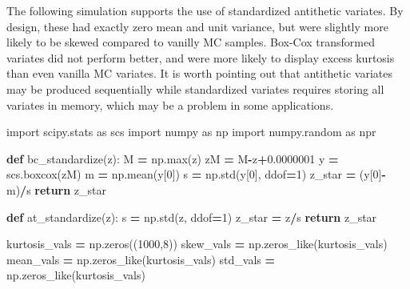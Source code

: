 \documentclass[
]{book}
\newenvironment{Shaded}{\begin{snugshade}}{\end{snugshade}}
\newcommand{\BuiltInTok}[1]{#1}
\newcommand{\ControlFlowTok}[1]{\textcolor[rgb]{0.13,0.29,0.53}{\textbf{#1}}}
\newcommand{\DecValTok}[1]{\textcolor[rgb]{0.00,0.00,0.81}{#1}}
\newcommand{\FloatTok}[1]{\textcolor[rgb]{0.00,0.00,0.81}{#1}}
\newcommand{\ImportTok}[1]{#1}
\newcommand{\KeywordTok}[1]{\textcolor[rgb]{0.13,0.29,0.53}{\textbf{#1}}}
\newcommand{\NormalTok}[1]{#1}
\newcommand{\OperatorTok}[1]{\textcolor[rgb]{0.81,0.36,0.00}{\textbf{#1}}}
\begin{document}
The following simulation supports the use of standardized antithetic variates. By design, these had exactly zero mean and unit variance, but were slightly more likely to be skewed compared to vanilly MC samples. Box-Cox transformed variates did not perform better, and were more likely to display excess kurtosis than even vanilla MC variates. It is worth pointing out that antithetic variates may be produced sequentially while standardized variates requires storing all variates in memory, which may be a problem in some applications.

\begin{Shaded}
\begin{Highlighting}[]
\ImportTok{import}\NormalTok{ scipy.stats  }\ImportTok{as}\NormalTok{ scs}
\ImportTok{import}\NormalTok{ numpy  }\ImportTok{as}\NormalTok{ np}
\ImportTok{import}\NormalTok{ numpy.random  }\ImportTok{as}\NormalTok{ npr}

\KeywordTok{def}\NormalTok{ bc\_standardize(z):}
\NormalTok{  M }\OperatorTok{=}\NormalTok{ np.}\BuiltInTok{max}\NormalTok{(z)}
\NormalTok{  zM }\OperatorTok{=}\NormalTok{ M}\OperatorTok{{-}}\NormalTok{z}\OperatorTok{+}\FloatTok{0.0000001}
\NormalTok{  y }\OperatorTok{=}\NormalTok{ scs.boxcox(zM)}
\NormalTok{  m }\OperatorTok{=}\NormalTok{ np.mean(y[}\DecValTok{0}\NormalTok{])}
\NormalTok{  s }\OperatorTok{=}\NormalTok{ np.std(y[}\DecValTok{0}\NormalTok{], ddof}\OperatorTok{=}\DecValTok{1}\NormalTok{)}
\NormalTok{  z\_star }\OperatorTok{=}\NormalTok{ (y[}\DecValTok{0}\NormalTok{]}\OperatorTok{{-}}\NormalTok{m)}\OperatorTok{/}\NormalTok{s}
  \ControlFlowTok{return}\NormalTok{ z\_star}

\KeywordTok{def}\NormalTok{ at\_standardize(z):}
\NormalTok{  s }\OperatorTok{=}\NormalTok{ np.std(z, ddof}\OperatorTok{=}\DecValTok{1}\NormalTok{)}
\NormalTok{  z\_star }\OperatorTok{=}\NormalTok{ z}\OperatorTok{/}\NormalTok{s}
  \ControlFlowTok{return}\NormalTok{ z\_star}

\NormalTok{kurtosis\_vals }\OperatorTok{=}\NormalTok{ np.zeros((}\DecValTok{1000}\NormalTok{,}\DecValTok{8}\NormalTok{))}
\NormalTok{skew\_vals }\OperatorTok{=}\NormalTok{ np.zeros\_like(kurtosis\_vals)}
\NormalTok{mean\_vals }\OperatorTok{=}\NormalTok{ np.zeros\_like(kurtosis\_vals)}
\NormalTok{std\_vals }\OperatorTok{=}\NormalTok{ np.zeros\_like(kurtosis\_vals)}


\end{Highlighting}
\end{Shaded}
\end{document}
